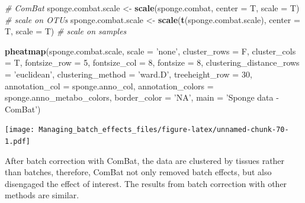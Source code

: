 \documentclass[]{book}
\newenvironment{Shaded}{\begin{snugshade}}{\end{snugshade}}
\newcommand{\KeywordTok}[1]{\textcolor[rgb]{0.13,0.29,0.53}{\textbf{#1}}}
\newcommand{\DataTypeTok}[1]{\textcolor[rgb]{0.13,0.29,0.53}{#1}}
\newcommand{\DecValTok}[1]{\textcolor[rgb]{0.00,0.00,0.81}{#1}}
\newcommand{\StringTok}[1]{\textcolor[rgb]{0.31,0.60,0.02}{#1}}
\newcommand{\CommentTok}[1]{\textcolor[rgb]{0.56,0.35,0.01}{\textit{#1}}}
\newcommand{\NormalTok}[1]{#1}
\begin{document}
\begin{Shaded}
\begin{Highlighting}[]
\CommentTok{# ComBat }
\NormalTok{sponge.combat.scale <-}\StringTok{ }\KeywordTok{scale}\NormalTok{(sponge.combat, }\DataTypeTok{center =}\NormalTok{ T, }\DataTypeTok{scale =}\NormalTok{ T) }
\CommentTok{# scale on OTUs}
\NormalTok{sponge.combat.scale <-}\StringTok{ }\KeywordTok{scale}\NormalTok{(}\KeywordTok{t}\NormalTok{(sponge.combat.scale), }\DataTypeTok{center =}\NormalTok{ T, }\DataTypeTok{scale =}\NormalTok{ T) }
\CommentTok{# scale on samples}

\KeywordTok{pheatmap}\NormalTok{(sponge.combat.scale, }
         \DataTypeTok{scale =} \StringTok{'none'}\NormalTok{, }
         \DataTypeTok{cluster_rows =}\NormalTok{ F, }
         \DataTypeTok{cluster_cols =}\NormalTok{ T, }
         \DataTypeTok{fontsize_row =} \DecValTok{5}\NormalTok{, }\DataTypeTok{fontsize_col =} \DecValTok{8}\NormalTok{,}
         \DataTypeTok{fontsize =} \DecValTok{8}\NormalTok{,}
         \DataTypeTok{clustering_distance_rows =} \StringTok{'euclidean'}\NormalTok{,}
         \DataTypeTok{clustering_method =} \StringTok{'ward.D'}\NormalTok{,}
         \DataTypeTok{treeheight_row =} \DecValTok{30}\NormalTok{,}
         \DataTypeTok{annotation_col =}\NormalTok{ sponge.anno_col,}
         \DataTypeTok{annotation_colors =}\NormalTok{ sponge.anno_metabo_colors,}
         \DataTypeTok{border_color =} \StringTok{'NA'}\NormalTok{,}
         \DataTypeTok{main =} \StringTok{'Sponge data - ComBat'}\NormalTok{)}
\end{Highlighting}
\end{Shaded}

\texttt{[image: Managing\_batch\_effects\_files/figure-latex/unnamed-chunk-70-1.pdf]}

After batch correction with ComBat, the data are clustered by tissues
rather than batches, therefore, ComBat not only removed batch effects,
but also disengaged the effect of interest. The results from batch
correction with other methods are similar.
\end{document}
